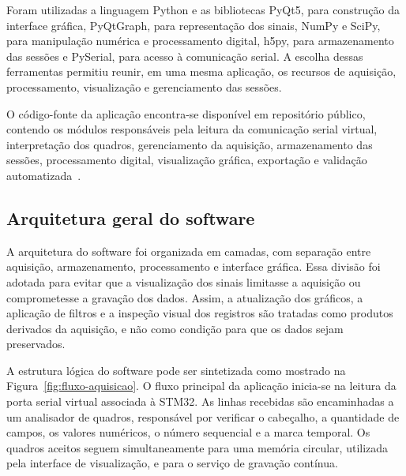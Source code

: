 \documentclass[a4paper,12pt]{fcte}
\begin{document}
Foram utilizadas a linguagem Python e as bibliotecas PyQt5, para construção da
interface gráfica, PyQtGraph, para representação dos sinais, NumPy e SciPy, para
manipulação numérica e processamento digital, h5py, para armazenamento das sessões e PySerial, para acesso à comunicação serial. A escolha dessas ferramentas permitiu reunir, em uma mesma aplicação, os recursos de aquisição, processamento, visualização e gerenciamento
das sessões.

O código-fonte da aplicação encontra-se disponível em repositório público, contendo os módulos responsáveis pela leitura da comunicação serial virtual, interpretação dos quadros, gerenciamento da aquisição, armazenamento das sessões, processamento digital, visualização gráfica, exportação e validação automatizada~\cite{software_processamento_biomedico}.

\subsection{Arquitetura geral do software}
\label{subsec:arquitetura_software}

A arquitetura do software foi organizada em camadas, com separação entre aquisição, armazenamento, processamento e interface gráfica. Essa divisão foi adotada para evitar que a visualização dos sinais limitasse a aquisição ou comprometesse a gravação dos dados. Assim, a atualização dos gráficos, a aplicação de filtros e a inspeção visual dos registros são tratadas como produtos derivados da aquisição, e não como condição para que os dados sejam preservados.

A estrutura lógica do software pode ser sintetizada como mostrado na Figura~\ref{fig:fluxo-aquisicao}. O fluxo principal da aplicação inicia-se na leitura da porta serial virtual associada à STM32. As linhas recebidas são encaminhadas a um analisador de quadros, responsável por verificar o cabeçalho, a quantidade de campos, os valores numéricos, o número sequencial e a marca temporal. Os quadros aceitos seguem simultaneamente para uma memória circular, utilizada pela interface de visualização, e para o serviço de gravação contínua.
\end{document}

